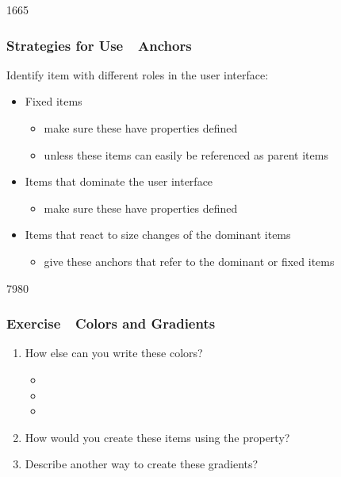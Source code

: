 \begin{slide}{1665}\frametitle{Strategies for Use~\textendash~Anchors}

Identify item with different roles in the user interface:

\begin{itemize}
\item Fixed items
  \begin{itemize}
  \item make sure these have  properties defined
  \item unless these items can easily be referenced as parent items
  \end{itemize}
\item Items that dominate the user interface
  \begin{itemize}
  \item make sure these have  properties defined
  \end{itemize}
\item Items that react to size changes of the dominant items
  \begin{itemize}
  \item give these anchors that refer to the dominant or fixed items
  \end{itemize}
\end{itemize}

\end{slide}      

\begin{slide}{7980}\frametitle{Exercise~\textendash~Colors and Gradients}

\begin{enumerate}
\item How else can you write these colors?
  \begin{itemize}
  \item {} %
  \item {} %
  \item {}
  \end{itemize}
\item How would you create these items using the  property?\\
\item Describe another way to create these gradients?
\end{enumerate}

\end{slide}

